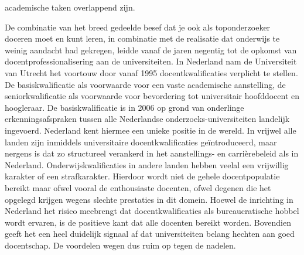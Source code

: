 \documentclass{jote-book}
\begin{document}
academische taken overlappend zijn.



	De combinatie van het breed gedeelde besef dat je ook als toponderzoeker doceren moet en kunt leren, in combinatie met de realisatie dat onderwijs te weinig aandacht had gekregen, leidde vanaf de jaren negentig tot de opkomst van docentprofessionalisering aan de universiteiten. In Nederland nam de Universiteit van Utrecht het voortouw door vanaf 1995 docentkwalificaties verplicht te stellen. De basiskwalificatie als voorwaarde voor een vaste academische aanstelling, de seniorkwalificatie als voorwaarde voor bevordering tot universitair hoofddocent en hoogleraar. De basiskwalificatie is in 2006 op grond van onderlinge erkenningsafspraken tussen alle Nederlandse onderzoeks-universiteiten landelijk ingevoerd. Nederland kent hiermee een unieke positie in de wereld. In vrijwel alle landen zijn inmiddels universitaire docentkwalificaties geïntroduceerd, maar nergens is dat zo structureel verankerd in het aanstellings- en carrièrebeleid als in Nederland. Onderwijskwalificaties in andere landen hebben veelal een vrijwillig karakter of een strafkarakter. Hierdoor wordt niet de gehele docentpopulatie bereikt maar ofwel vooral de enthousiaste docenten, ofwel degenen die het opgelegd krijgen wegens slechte prestaties in dit domein. Hoewel de inrichting in Nederland het risico meebrengt dat docentkwalificaties als bureaucratische hobbel wordt ervaren, is de positieve kant dat alle docenten bereikt worden. Bovendien geeft het een heel duidelijk signaal af dat universiteiten belang hechten aan goed docentschap. De voordelen wegen dus ruim op tegen de nadelen.
\end{document}
